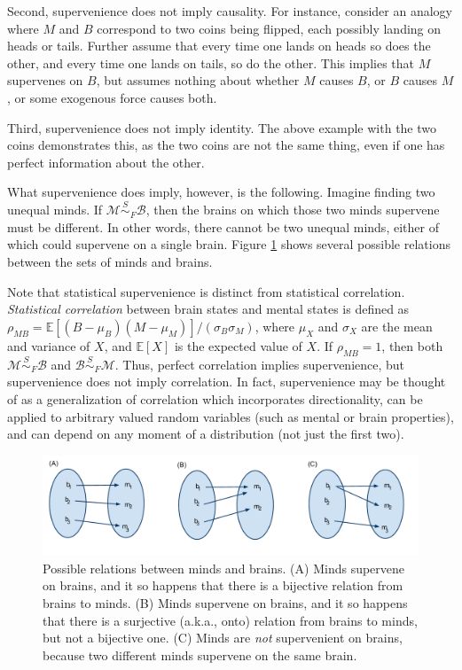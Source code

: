 \documentclass{article}
\newcommand{\mB}{\mathcal{B}}
\newcommand{\mM}{\mathcal{M}}
\newcommand{\PP}{F}           %
\newcommand{\EE}{\mathbb{E}}           %
\newcommand{\sig}{\sigma}
\newcommand{\MsB}{\mM \overset{S}{\sim}_{\PP} \mB}
\begin{document}
Second,  supervenience does not imply causality. %
For instance, consider an analogy where $M$ and $B$ correspond to two coins being flipped, each possibly landing on heads or tails.  Further assume that every time one lands on heads so does the other, and every time one lands on tails, so do the other. This implies that $M$ supervenes on $B$, but assumes nothing about whether $M$ causes $B$, or $B$ causes $M$, or some exogenous force causes both.  

Third, supervenience does not imply identity.  The above example with the two coins demonstrates this, as the two coins are not the same thing, even if one has perfect information about the other.  

What supervenience does imply, however, is the following.   Imagine finding two unequal minds.  If $\MsB$, then the brains on which those two minds supervene must be different.  In other words, there cannot be two unequal minds, either of which could supervene on a single brain.  Figure \ref{fig:rel} shows several possible relations between the sets of minds and brains.


Note that statistical supervenience is distinct from statistical correlation.  \emph{Statistical correlation} between brain states and mental states is defined as $\rho_{MB}=\EE[(B-\mu_B)(M-\mu_M)]/(\sig_B \sig_M)$, where $\mu_X$ and $\sig_X$ are the mean and variance of $X$, and $\EE[X]$ is the expected value of $X$.  If $\rho_{MB}=1$, then both $\MsB$ and $\mB \overset{S}{{\sim}}_{F} \mM$. Thus, perfect correlation implies supervenience, but supervenience does not imply correlation.  In fact, supervenience may be thought of as a generalization of correlation which incorporates directionality, can be applied to arbitrary valued random variables (such as mental or brain properties), and can depend on any moment of a distribution (not just the first two).


\begin{figure}[h!tbp]
	\centering
		\includegraphics[width=1\linewidth]{supervenience_relations.pdf}
	\caption{Possible relations between minds and brains.  (A) Minds supervene on brains, and it so happens that there is a bijective relation from brains to minds.  (B) Minds supervene on brains, and it so happens that there is a surjective (a.k.a., onto) relation from brains to minds, but not a bijective one. (C) Minds are \emph{not} supervenient on brains, because two different minds supervene on the same brain.}
	\label{fig:rel}
\end{figure}





% 
% 
\end{document}
